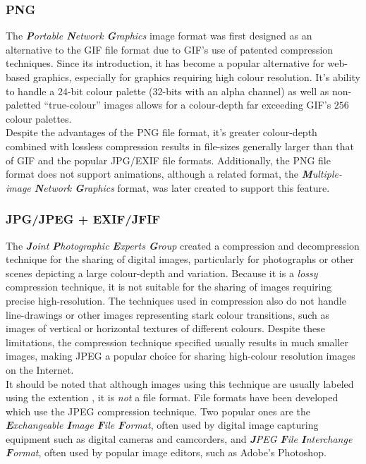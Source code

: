       \subsubsection{PNG}
        The \emph{\textbf{P}ortable \textbf{N}etwork \textbf{G}raphics} image format was first designed as an alternative to the GIF file format due to GIF's use of patented compression techniques. Since its introduction, it has become a popular alternative for web-based graphics, especially for graphics requiring high colour resolution. It's ability to handle a 24-bit colour palette (32-bits with an alpha channel) as well as non-paletted ``true-colour'' images allows for a colour-depth far exceeding GIF's $256$ colour palettes.\\[\baselineskip]
        Despite the advantages of the PNG file format, it's greater colour-depth combined with lossless compression results in file-sizes generally larger than that of GIF and the popular JPG/EXIF file formats. Additionally, the PNG file format does not support animations, although a related format, the \emph{\textbf{M}ultiple-image \textbf{N}etwork \textbf{G}raphics} format, was later created to support this feature.
      \subsubsection{JPG/JPEG + EXIF/JFIF}
        The \emph{\textbf{J}oint \textbf{P}hotographic \textbf{E}xperts \textbf{G}roup} created a compression and decompression technique for the sharing of digital images, particularly for photographs or other scenes depicting a large colour-depth and variation. Because it is a \emph{lossy} compression technique, it is not suitable for the sharing of images requiring precise high-resolution. The techniques used in compression also do not handle line-drawings or other images representing stark colour transitions, such as images of vertical or horizontal textures of different colours. Despite these limitations, the compression technique specified usually results in much smaller images, making JPEG a popular choice for sharing high-colour resolution images on the Internet.\\[\baselineskip]
        It should be noted that although images using this technique are usually labeled using the extention , it is \emph{not} a file format. File formats have been developed which use the JPEG compression technique. Two popular ones are the \emph{\textbf{E}xchangeable \textbf{I}mage \textbf{F}ile \textbf{F}ormat}, often used by digital image capturing equipment such as digital cameras and camcorders, and \emph{\textbf{J}PEG \textbf{F}ile \textbf{I}nterchange \textbf{F}ormat}, often used by popular image editors, such as Adobe's Photoshop\textregistered.

